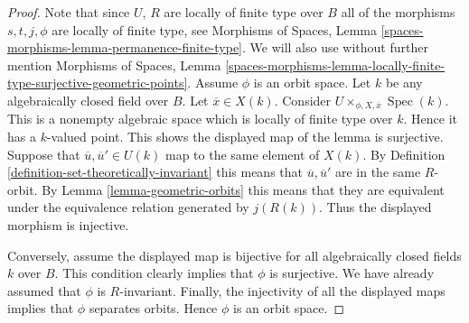 \documentclass[10pt,a4paper]{amsart}
\theoremstyle{plain}
\theoremstyle{definition}
\theoremstyle{remark}
\numberwithin{equation}{subsection}
\def\Spec{\mathop{\mathrm{Spec}}}
\begin{document}
\begin{proof}
Note that since $U$, $R$ are locally of finite type over $B$ all of the
morphisms $s, t, j, \phi$ are locally of finite type, see
Morphisms of Spaces, Lemma \ref{spaces-morphisms-lemma-permanence-finite-type}.
We will also use without further mention
Morphisms of Spaces, Lemma
\ref{spaces-morphisms-lemma-locally-finite-type-surjective-geometric-points}.
Assume $\phi$ is an orbit space. Let $k$ be any algebraically closed
field over $B$. Let $\overline{x} \in X(k)$. Consider
$U \times_{\phi, X, \overline{x}} \Spec(k)$.
This is a nonempty algebraic space
which is locally of finite type over $k$. Hence it has a $k$-valued point.
This shows the displayed map of the lemma is surjective.
Suppose that $\overline{u}, \overline{u}' \in U(k)$ map to the same
element of $X(k)$. By
Definition \ref{definition-set-theoretically-invariant}
this means that $\overline{u}, \overline{u}'$ are in the same
$R$-orbit. By Lemma \ref{lemma-geometric-orbits} this means that
they are equivalent under the equivalence relation generated by
$j(R(k))$. Thus the displayed morphism is injective.

\medskip\noindent
Conversely, assume the displayed map is bijective for all algebraically
closed fields $k$ over $B$. This condition clearly implies that $\phi$
is surjective. We have already assumed that $\phi$ is $R$-invariant.
Finally, the injectivity of all the displayed maps implies that
$\phi$ separates orbits. Hence $\phi$ is an orbit space.
\end{proof}
\end{document}
